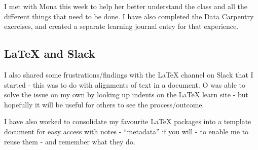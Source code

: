 \documentclass{article}
\begin{document}
I met with Mona this week to help her better understand the class and all the different things that need to be done. I have also completed the Data Carpentry exercises, and created a separate learning journal entry for that experience. 

\subsection{LaTeX and Slack}
\label{ Error: LaTeX Alignment}
I also shared some frustrations/findings with the LaTeX channel on Slack that I started - this was to do with alignments of text in a document. O was able to solve the issue on my own by looking up indents on the LaTeX learn site - but hopefully it will be useful for others to see the process/outcome.

I have also worked to consolidate my favourite LaTeX packages into a template document for easy access with notes - ``metadata'' if you will - to enable me to reuse them - and remember what they do. 
\end{document}
